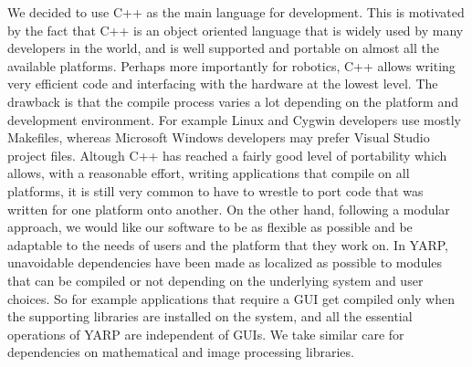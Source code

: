 We decided to use C++ as the main language for development. This 
is motivated by the fact that C++ is an object oriented language
that is widely used by many developers in the world, and is well 
supported and portable on almost all the available platforms. 
Perhaps more importantly for robotics, C++ allows writing very 
efficient code and interfacing with the hardware at the lowest 
level.
%
The drawback is that the compile process varies a lot depending 
on the platform and development environment. For example Linux 
and Cygwin developers use mostly Makefiles, whereas Microsoft Windows 
developers may prefer Visual Studio project files. 
Altough C++ has reached a fairly good level 
of portability which allows, with a reasonable effort, writing 
applications that compile on all platforms, it is still very 
common to have to wrestle to port code that was written for 
one platform onto another. On the other hand, following a 
modular approach, we would like our software to be as flexible 
as possible and be adaptable to the needs of users and the platform that 
they work on. In YARP, unavoidable dependencies 
have been made as localized as possible to modules that can be 
compiled or not depending on the underlying system and user 
choices. So for example applications that require a GUI get
compiled only when the supporting libraries
%
%
are installed on the system, and all the essential operations
of YARP are independent of GUIs.
%
%
We take similar care for dependencies on mathematical and 
image processing libraries.
%

